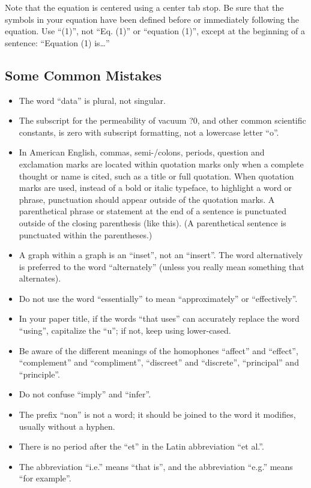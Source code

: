 \documentclass[letterpaper, 10 pt, conference]{ieeeconf}  %
\begin{document}
Note that the equation is centered using a center tab stop. Be sure that the symbols in your equation have been defined before or immediately following the equation. Use ``(1)'', not ``Eq. (1)'' or ``equation (1)'', except at the beginning of a sentence: ``Equation (1) is\ldots''

\subsection{Some Common Mistakes}
\begin{itemize}


\item The word ``data'' is plural, not singular.
\item The subscript for the permeability of vacuum ?0, and other common scientific constants, is zero with subscript formatting, not a lowercase letter ``o''.
\item In American English, commas, semi-/colons, periods, question and exclamation marks are located within quotation marks only when a complete thought or name is cited, such as a title or full quotation. When quotation marks are used, instead of a bold or italic typeface, to highlight a word or phrase, punctuation should appear outside of the quotation marks. A parenthetical phrase or statement at the end of a sentence is punctuated outside of the closing parenthesis (like this). (A parenthetical sentence is punctuated within the parentheses.)
\item A graph within a graph is an ``inset'', not an ``insert''. The word alternatively is preferred to the word ``alternately'' (unless you really mean something that alternates).
\item Do not use the word ``essentially'' to mean ``approximately'' or ``effectively''.
\item In your paper title, if the words ``that uses'' can accurately replace the word ``using'', capitalize the ``u''; if not, keep using lower-cased.
\item Be aware of the different meanings of the homophones ``affect'' and ``effect'', ``complement'' and ``compliment'', ``discreet'' and ``discrete'', ``principal'' and ``principle''.
\item Do not confuse ``imply'' and ``infer''.
\item The prefix ``non'' is not a word; it should be joined to the word it modifies, usually without a hyphen.
\item There is no period after the ``et'' in the Latin abbreviation ``et al.''.
\item The abbreviation ``i.e.'' means ``that is'', and the abbreviation ``e.g.'' means ``for example''.

\end{itemize}
\end{document}
